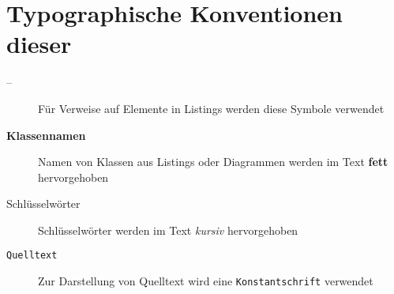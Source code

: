 \section{Typographische Konventionen dieser \thesisDesignator{}}
\label{sec:typographicConventions}

\begin{description}
    \item[ -- ] Für Verweise auf Elemente in Listings werden diese Symbole verwendet
    \item[\textbf{Klassennamen}] Namen von Klassen aus Listings oder Diagrammen werden im Text \textbf{fett} hervorgehoben
    \item[Schlüsselwörter] Schlüsselwörter werden im Text \emph{kursiv} hervorgehoben
    \item[\texttt{Quelltext}] Zur Darstellung von Quelltext wird eine \texttt{Konstantschrift} verwendet
\end{description}